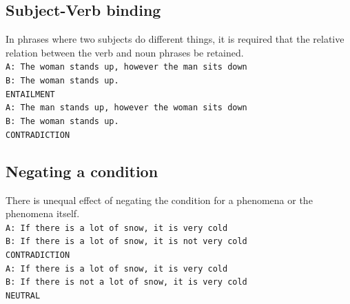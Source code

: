 \documentclass[10pt,letterpaper]{article}
\begin{document}
\subsection{Subject-Verb binding}
In phrases where two subjects do different things, it is required that the relative relation between the verb and noun phrases be retained.\\
{\tt A: The woman stands up, however the man sits down \\ B: The woman stands up. \\ ENTAILMENT \\}{\tt A: The man stands up, however the woman sits down \\ B: The woman stands up. \\ CONTRADICTION}

\subsection{Negating a condition}
There is unequal effect of negating the condition for a phenomena or the phenomena itself. \\
{\tt A: If there is a lot of snow, it is very cold \\ B: If there is a lot of snow, it is not very cold \\ CONTRADICTION \\}{\tt A: If there is a lot of snow, it is very cold \\ B: If there is not a lot of snow, it is very cold \\ NEUTRAL}
\end{document}
